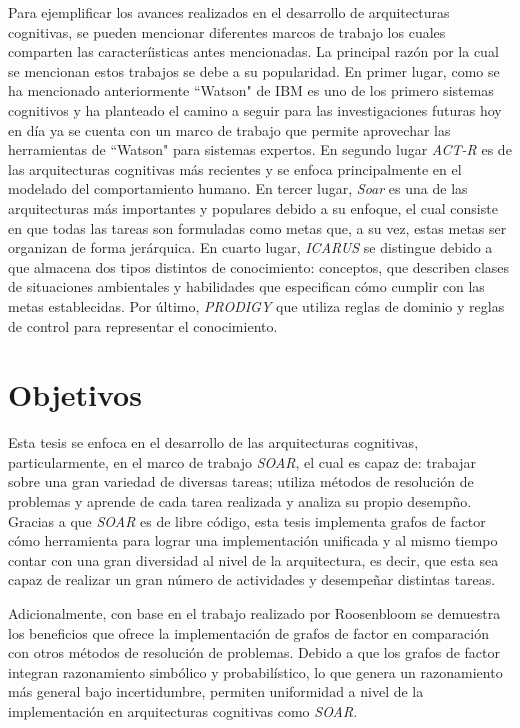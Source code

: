 Para ejemplificar los avances realizados en el desarrollo de arquitecturas cognitivas, se pueden mencionar diferentes marcos de trabajo los cuales comparten las caracter\'{i}isticas antes mencionadas. La principal raz\'{o}n por la cual se mencionan estos trabajos se debe a su popularidad. En primer lugar, como se ha mencionado anteriormente “Watson" de IBM es uno de los primero sistemas cognitivos y ha planteado el camino a seguir para las investigaciones futuras hoy en d\'{i}a ya se cuenta con un marco de trabajo que permite aprovechar las herramientas de “Watson" para sistemas expertos. En segundo lugar \emph{ACT-R} \cite{anderson1997act} es de las arquitecturas cognitivas m\'{a}s recientes y se enfoca principalmente en el modelado del comportamiento humano. En tercer lugar, \emph{Soar} \cite{soar1987} es una de las arquitecturas m\'{a}s importantes y populares debido a su enfoque, el cual consiste en que todas las tareas son formuladas como metas que, a su vez, estas metas ser organizan de forma jer\'{a}rquica. En cuarto lugar, \emph{ICARUS} \cite{langley1991design} se distingue debido a que almacena dos tipos distintos de conocimiento: conceptos, que describen clases de situaciones ambientales y habilidades que especifican c\'{o}mo cumplir con las metas establecidas. Por \'{ultimo}, \emph{PRODIGY} \cite{carbonell1991prodigy} que utiliza reglas de dominio y reglas de control para representar el conocimiento.

\section{Objetivos}

Esta tesis se enfoca en el desarrollo de las arquitecturas cognitivas, particularmente, en el marco de trabajo \emph{SOAR}, el cual es capaz de: trabajar sobre una gran variedad de diversas tareas; utiliza m\'{e}todos de resoluci\'{o}n de problemas y aprende de cada tarea realizada y analiza su propio desemp\~no. Gracias a que \emph{SOAR} es de libre c\'{o}digo, esta tesis implementa grafos de factor c\'{o}mo herramienta para lograr una implementaci\'{o}n unificada y al mismo tiempo contar con una gran diversidad al nivel de la arquitectura, es decir, que esta sea capaz de realizar un gran n\'{u}mero de actividades y desempe\~nar distintas tareas.

Adicionalmente, con base en el trabajo realizado por Roosenbloom se demuestra los beneficios que ofrece la implementaci\'{o}n de grafos de factor en comparaci\'{o}n con otros m\'{e}todos de resoluci\'{o}n de problemas. Debido a que los grafos de factor integran razonamiento simb\'{o}lico y probabil\'{i}stico, lo que genera un razonamiento m\'{a}s general bajo incertidumbre, permiten uniformidad a nivel de la implementaci\'{o}n en arquitecturas cognitivas como \emph{SOAR}\cite{rosenbloom2009towards}.

